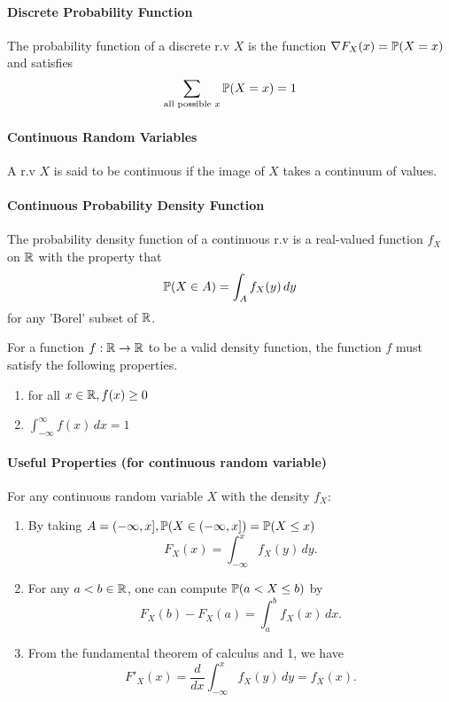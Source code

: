 \paragraph{Discrete Probability Function}
The probability function of a discrete r.v \(X\) is the function \(\nabla F_X(x) = \mathbb{P}(X = x)\) and satisfies
\[\sum_{\text{all possible } x} \mathbb{P}(X = x) = 1\]

\paragraph{Continuous Random Variables}
A r.v \(X\) is said to be continuous if the image of \(X\) takes a continuum of values.

\paragraph{Continuous Probability Density Function}
The probability density function of a continuous r.v is a real-valued function \(f_X\) on \(\mathbb{R}\) with the property that 
\[\mathbb{P}(X \in A) = \int_A f_X(y) \, dy\]
for any 'Borel' subset of \(\mathbb{R}\).

For a function \(f: \mathbb{R} \to \mathbb{R}\) to be a valid density function, the function \(f\) must satisfy the following properties. 
\begin{enumerate}
    \item for all \(x \in \mathbb{R}, f(x) \geq 0\)
    \item \(\int_{-\infty}^{\infty} f(x) \, dx = 1\)
\end{enumerate}

\paragraph{Useful Properties (for continuous random variable)}
For any continuous random variable \(X\) with the density \(f_X\):
\begin{enumerate}
    \item By taking \(A = ( -\infty, x], \mathbb{P}(X \in (-\infty, x]) = \mathbb{P}(X \leq x)\)  
    \[F_X(x) = \int_{-\infty}^x f_X(y) \, dy.\]
    \item For any \(a < b \in \mathbb{R}\), one can compute \(\mathbb{P}(a < X \leq b)\) by 
    \[F_X(b) - F_X(a) = \int_a^b f_X(x) \, dx.\]
    \item From the fundamental theorem of calculus and 1, we have
    \[F'_X(x) = \frac{d}{dx}\int_{-\infty}^x f_X(y) \, dy = f_X(x).\]
\end{enumerate}

